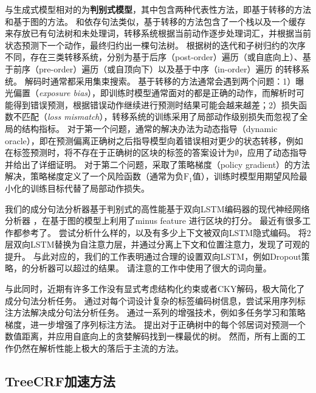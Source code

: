 与生成式模型相对的为\textbf{判别式模型}，其中包含两种代表性方法，即基于转移的方法和基于图的方法。
和依存句法类似，基于转移的方法包含了一个栈以及一个缓存来存放已有句法树和未处理词，转移系统根据当前动作逐步处理词汇，并根据当前状态预测下一个动作，最终归约出一棵句法树。
根据树的迭代和子树归约的次序不同，存在三类转移系统，分别为基于后序（post-order）遍历（或自底向上）、基于前序（pre-order）遍历（或自顶向下）以及基于中序（in-order）遍历 \citep{liu-zhang-2017-order}的转移系统。
解码时通常都采用集束搜索。
基于转移的方法通常会遇到两个问题：1）曝光偏置（\emph{exposure bias}），即训练时模型通常面对的都是正确的动作，而解析时可能得到错误预测，根据错误动作继续进行预测时结果可能会越来越差；2）损失函数不匹配（\emph{loss mismatch}），转移系统的训练采用了局部动作级别损失而忽视了全局的结构指标。
对于第一个问题，通常的解决办法为动态指导（dynamic oracle），即在预测偏离正确树之后指导模型向着错误相对更少的状态转移，例如在标签预测时，将不存在于正确树的区块的标签的答案设计为$\emptyset$，\citet{cross-huang-2016-span}应用了动态指导并给出了详细证明。
对于第二个问题，\citet{fried-klein-2018-policy}采取了策略梯度（policy gradient）的方法解决，策略梯度定义了一个风险函数（通常为负$\mathrm{F}_1$值），训练时模型用期望风险最小化的训练目标代替了局部动作损失。

我们的成分句法分析器基于判别式的高性能基于双向LSTM编码器的现代神经网络分析器 \citep{stern-etal-2017-minimal}，在基于图的模型上利用了minus feature \citep{cross-huang-2016-span}进行区块的打分。
最近有很多工作都参考了\citet{stern-etal-2017-minimal}。
\citet{gaddy-etal-2018-whats}尝试分析什么样的，以及有多少上下文被双向LSTM隐式编码。
\citet{kitaev-klein-2018-constituency}将2层双向LSTM替换为自注意力层，并通过分离上下文和位置注意力，发现了可观的提升。
与此对应的，我们的工作表明通过合理的设置双向LSTM，例如Dropout策略，\citet{stern-etal-2017-minimal}的分析器可以超过\citet{kitaev-klein-2018-constituency}的结果。
请注意\citet{kitaev-klein-2018-constituency}的工作中使用了很大的词向量。

与此同时，近期有许多工作没有显式考虑结构化约束或者CKY解码，极大简化了成分句法分析任务。
\citet{gomez-rodriguez-vilares-2018-constituent}通过对每个词设计复杂的标签编码树信息，尝试采用序列标注方法解决成分句法分析任务。
\citet{vilares-etal-2019-better}通过一系列的增强技术，例如多任务学习和策略梯度，进一步增强了序列标注方法。
\citet{shen-etal-2018-straight}提出对于正确树中的每个邻居词对预测一个数值距离，并应用自底向上的贪婪解码找到一棵最优的树。
然而，所有上面的工作仍然在解析性能上极大的落后于主流的方法。

\subsection{TreeCRF加速方法}

